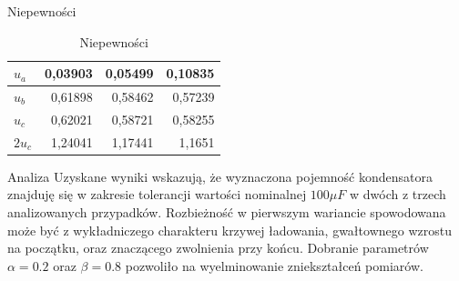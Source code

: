 \documentclass[8pt]{beamer}
\begin{document}
\begin{frame}{Niepewności}
\begin{table}[H]
\centering
\caption{Niepewności}
\begin{tabular}{|l|r|r|r|}
\toprule
$u_a$    & 0,03903 & 0,05499 & 0,10835 \\
\midrule
$u_b$    & 0,61898 & 0,58462 & 0,57239 \\
\midrule
$u_c$    & 0,62021 & 0,58721 & 0,58255 \\
\midrule
$2u_c$   & 1,24041 & 1,17441 & 1,1651 \\
\bottomrule
\end{tabular}
\end{table}
\end{frame}

\begin{frame}{Analiza}
Uzyskane wyniki wskazują, że wyznaczona pojemność kondensatora znajduję się w zakresie tolerancji wartości nominalnej $100 \mu F$ w dwóch z trzech analizowanych przypadków.
Rozbieżność w pierwszym wariancie spowodowana może być z wykładniczego charakteru krzywej ładowania, gwałtownego wzrostu na początku, oraz znaczącego zwolnienia przy końcu. Dobranie parametrów $\alpha = 0.2$ oraz $\beta = 0.8$ pozwoliło na wyelminowanie zniekształceń pomiarów.
\end{frame}
\end{document}
